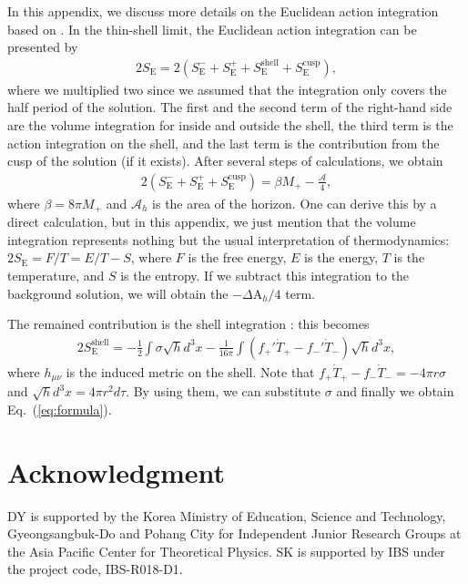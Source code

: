 \documentclass[preprintnumbers,10pt,nofootinbib]{revtex4}
\begin{document}
In this appendix, we discuss more details on the Euclidean action integration based on \cite{Gregory:2013hja}. In the thin-shell limit, the Euclidean action integration can be presented by
\begin{eqnarray}
2 S_{\mathrm{E}} = 2 \left( S_{\mathrm{E}}^{-} + S_{\mathrm{E}}^{+} + S_{\mathrm{E}}^{\mathrm{shell}} + S_{\mathrm{E}}^{\mathrm{cusp}} \right),
\end{eqnarray}
where we multiplied two since we assumed that the integration only covers the half period of the solution. The first and the second term of the right-hand side are the volume integration for inside and outside the shell, the third term is the action integration on the shell, and the last term is the contribution from the cusp of the solution (if it exists). After several steps of calculations, we obtain
\begin{eqnarray}
2 \left( S_{\mathrm{E}}^{-} + S_{\mathrm{E}}^{+} + S_{\mathrm{E}}^{\mathrm{cusp}} \right) = \beta M_{+} - \frac{\mathcal{A}}{4},
\end{eqnarray}
where $\beta = 8\pi M_{+}$ and $\mathcal{A}_{h}$ is the area of the horizon. One can derive this by a direct calculation, but in this appendix, we just mention that the volume integration represents nothing but the usual interpretation of thermodynamics: $2S_{\mathrm{E}} = F/T = E/T - S$, where $F$ is the free energy, $E$ is the energy, $T$ is the temperature, and $S$ is the entropy. If we subtract this integration to the background solution, we will obtain the $- \Delta \mathrm{A}_{h}/4$ term.

The remained contribution is the shell integration \cite{Gregory:2013hja}: this becomes
\begin{eqnarray}
2 S_{\mathrm{E}}^{\mathrm{shell}} = - \frac{1}{2} \int \sigma \sqrt{h} d^{3}x - \frac{1}{16 \pi} \int \left( f_{+}' \dot{T}_{+} - f_{-}' \dot{T}_{-} \right) \sqrt{h} d^{3} x,
\end{eqnarray}
where $h_{\mu\nu}$ is the induced metric on the shell. Note that $f_{+} \dot{T}_{+} - f_{-} \dot{T}_{-} = - 4\pi r \sigma$ and $\sqrt{h}d^{3}x = 4\pi r^{2}d\tau$. By using them, we can substitute $\sigma$ and finally we obtain Eq.~(\ref{eq:formula}).


\section*{Acknowledgment}

DY is supported by the Korea Ministry of Education, Science and Technology, Gyeongsangbuk-Do and Pohang City for Independent Junior Research Groups at the Asia Pacific Center for Theoretical Physics. SK is supported by IBS under the project code, IBS-R018-D1.
\end{document}
